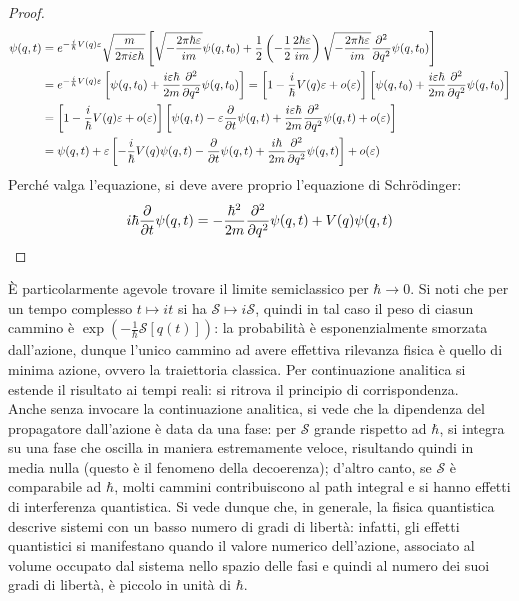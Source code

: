 \begin{proof}
\begin{equation*}
\begin{split}
			\psi(q,t)
			&= e^{-\frac{i}{\hbar} V(q) \varepsilon} \sqrt{\frac{m}{2\pi i \varepsilon \hbar}} \left[ \sqrt{-\frac{2\pi \hbar \varepsilon}{i m}} \psi(q,t_0) + \frac{1}{2} \left( - \frac{1}{2} \frac{2\hbar \varepsilon}{im} \right) \sqrt{- \frac{2\pi\hbar \varepsilon}{im}} \frac{\partial^2}{\partial q^2} \psi(q,t_0) \right] \\
			&= e^{-\frac{i}{\hbar} V(q) \varepsilon} \left[ \psi(q,t_0) + \frac{i \varepsilon \hbar}{2m} \frac{\partial^2}{\partial q^2} \psi(q,t_0) \right] = \left[ 1 - \frac{i}{\hbar} V(q) \varepsilon + o(\varepsilon) \right] \left[ \psi(q,t_0) + \frac{i \varepsilon \hbar}{2m} \frac{\partial^2}{\partial q^2} \psi(q,t_0) \right] \\
			&= \left[ 1 - \frac{i}{\hbar} V(q) \varepsilon + o(\varepsilon) \right] \left[ \psi(q,t) - \varepsilon \frac{\partial}{\partial t} \psi(q,t) + \frac{i \varepsilon \hbar}{2m} \frac{\partial^2}{\partial q^2} \psi(q,t) + o(\varepsilon) \right] \\
			&= \psi(q,t) + \varepsilon \left[ - \frac{i}{\hbar} V(q) \psi(q,t) - \frac{\partial}{\partial t} \psi(q,t) + \frac{i\hbar}{2m} \frac{\partial^2}{\partial q^2} \psi(q,t) \right] + o(\varepsilon)
		\end{split}
	\end{equation*}
	Perché valga l'equazione, si deve avere proprio l'equazione di Schrödinger:
	\begin{equation*}
		i\hbar \frac{\partial}{\partial t} \psi(q,t) = -\frac{\hbar^2}{2m} \frac{\partial^2}{\partial q^2} \psi(q,t) + V(q) \psi(q,t)
	\end{equation*}
\end{proof}

È particolarmente agevole trovare il limite semiclassico per $ \hbar \rightarrow 0 $. Si noti che per un tempo complesso $ t \mapsto it $ si ha $ \mathcal{S} \mapsto i\mathcal{S} $, quindi in tal caso il peso di ciasun cammino è $ \exp\left( - \frac{1}{\hbar} \mathcal{S}[q(t)] \right) $: la probabilità è esponenzialmente smorzata dall'azione, dunque l'unico cammino ad avere effettiva rilevanza fisica è quello di minima azione, ovvero la traiettoria classica. Per continuazione analitica si estende il risultato ai tempi reali: si ritrova il principio di corrispondenza.\\
Anche senza invocare la continuazione analitica, si vede che la dipendenza del propagatore dall'azione è data da una fase: per $ \mathcal{S} $ grande rispetto ad $ \hbar $, si integra su una fase che oscilla in maniera estremamente veloce, risultando quindi in media nulla (questo è il fenomeno della decoerenza); d'altro canto, se $ \mathcal{S} $ è comparabile ad $ \hbar $, molti cammini contribuiscono al path integral e si hanno effetti di interferenza quantistica. Si vede dunque che, in generale, la fisica quantistica descrive sistemi con un basso numero di gradi di libertà: infatti, gli effetti quantistici si manifestano quando il valore numerico dell'azione, associato al volume occupato dal sistema nello spazio delle fasi e quindi al numero dei suoi gradi di libertà, è piccolo in unità di $ \hbar $.










